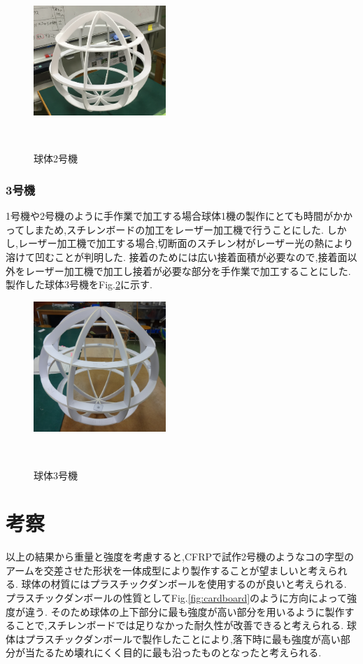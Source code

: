 \documentclass[a4paper]{jarticle}
\begin{document}
\begin{figure}[htbp]
 \begin{center}
  \includegraphics[width=50mm]{image/sphere-2.JPG}
 　\caption{球体2号機}
 　\label{fig:sphere-2}
 \end{center}
\end{figure}

\subsubsection{3号機}
1号機や2号機のように手作業で加工する場合球体1機の製作にとても時間がかかってしまため,スチレンボードの加工をレーザー加工機で行うことにした.
しかし,レーザー加工機で加工する場合,切断面のスチレン材がレーザー光の熱により溶けて凹むことが判明した.
接着のためには広い接着面積が必要なので,接着面以外をレーザー加工機で加工し接着が必要な部分を手作業で加工することにした.
製作した球体3号機をFig.\ref{fig:sphere-3}に示す.

\begin{figure}[htbp]
 \begin{center}
  \includegraphics[width=50mm]{image/sphere-3.JPG}
 　\caption{球体3号機}
 　\label{fig:sphere-3}
 \end{center}
\end{figure}

\section{考察}
以上の結果から重量と強度を考慮すると,CFRPで試作2号機のようなコの字型のアームを交差させた形状を一体成型により製作することが望ましいと考えられる.
球体の材質にはプラスチックダンボールを使用するのが良いと考えられる.
プラスチックダンボールの性質としてFig.\ref{fig:cardboard}のように方向によって強度が違う.
そのため球体の上下部分に最も強度が高い部分を用いるように製作することで,スチレンボードでは足りなかった耐久性が改善できると考えられる.
球体はプラスチックダンボールで製作したことにより,落下時に最も強度が高い部分が当たるため壊れにくく目的に最も沿ったものとなったと考えられる.
\end{document}
